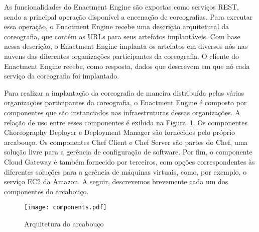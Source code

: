 As funcionalidades do Enactment Engine são expostas como serviços REST, sendo a principal operação disponível a encenação de coreografias. Para executar essa operação, o Enactment Engine recebe uma descrição arquitetural da coreografia, que contém as URLs para seus artefatos implantáveis. Com base nessa descrição, o Enactment Engine implanta os artefatos em diversos nós nas nuvens das diferentes organizações participantes da coreografia. O cliente do Enactment Engine recebe, como resposta, dados que descrevem em que nó cada serviço da coreografia foi implantado.

Para realizar a implantação da coreografia de maneira distribuída pelas várias organizações participantes da coreografia, o Enactment Engine é composto por  componentes que são instanciados nas infraestruturas dessas organizações. A relação de uso entre esses componentes é exibida na Figura~\ref{fig:ee_componentes}. Os componentes Choreography Deployer e Deployment Manager são fornecidos pelo próprio arcabouço. Os componentes Chef Client e Chef Server são partes do Chef, uma solução livre para a gerência de configuração de software. Por fim, o componente Cloud Gateway é também fornecido por terceiros, com opções correspondentes às diferentes soluções para a gerência de máquinas virtuais, como, por exemplo, o serviço EC2 da Amazon. A seguir, descrevemos brevemente cada um dos componentes do arcabouço.

\begin{figure}[!h]
  \centering
  \texttt{[image: components.pdf]} 
  \caption{Arquitetura do arcabouço \ee}
  \label{fig:ee_componentes} 
\end{figure}

